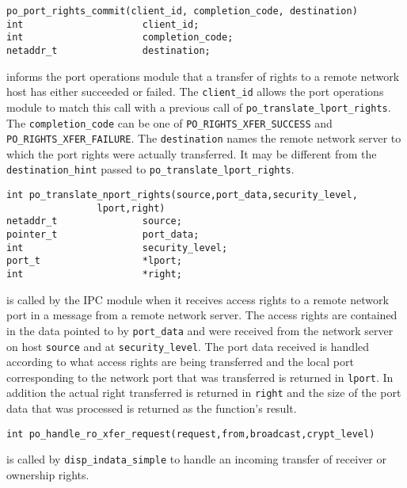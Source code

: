 \begin{verbatim}
po_port_rights_commit(client_id, completion_code, destination)
int                     client_id;
int                     completion_code;
netaddr_t               destination;
\end{verbatim}
\begin{sloppy}
informs the port operations module that a transfer of rights to a remote
network host has either succeeded or failed.  The \verb"client_id" allows
the port operations module to match this call with a previous call of
\verb"po_translate_lport_rights".  The \verb"completion_code" can be one of
\verb"PO_RIGHTS_"\linebreak[0]\verb"XFER_SUCCESS" and
\verb"PO_RIGHTS_"\linebreak[0]\verb"XFER_FAILURE".
The \verb"destination" names the remote network server to which the port
rights were actually transferred.  It may be different from the
\verb"destination_"\linebreak[0]\verb"hint" passed to
\verb"po_translate_"\linebreak[0]\verb"lport_rights".
\end{sloppy}

\begin{verbatim}
int po_translate_nport_rights(source,port_data,security_level,
                lport,right)
netaddr_t               source;
pointer_t               port_data;
int                     security_level;
port_t                  *lport;
int                     *right;
\end{verbatim}
is called by the IPC module when it receives access rights to a remote
network port in a message from a remote network server.  The access rights
are contained in the data pointed to by \verb"port_data" and were received
from the network server on host \verb"source" and at \verb"security_level".
The port data received is handled according to what access rights are being
transferred and the local port corresponding to the network port that was
transferred is returned in \verb"lport".  In addition the actual right
transferred is returned in \verb"right" and the size of the port data that
was processed is returned as the function's result.

\begin{verbatim}
int po_handle_ro_xfer_request(request,from,broadcast,crypt_level)
\end{verbatim}
is called by \verb"disp_indata_simple" to handle an incoming transfer of
receiver or ownership rights.

